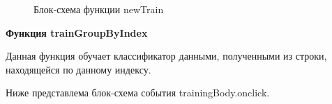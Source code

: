 \documentclass[14pt,a4paper]{extreport}
\begin{document}
    \begin{figure}[h]
    \caption{Блок-схема функции newTrain}
    \label{ris:image}
    \end{figure}
    \newpage \par \small \textbf{Функция trainGroupByIndex}
    \\ \par Данная функция обучает классификатор данными, полученными из строки, находящейся по данному индексу.
    \par Ниже представлема блок-схема события trainingBody.onclick.
\end{document}
